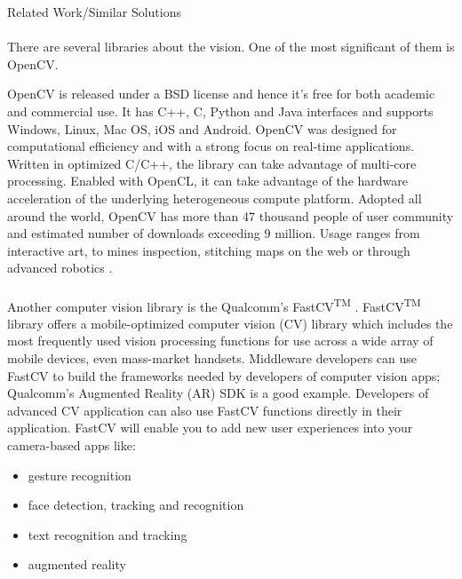 \documentclass[12pt, a4paper]{article} \pagenumbering{gobble}
\begin{document}
\vfill
\newpage
\begin{section}{Related Work/Similar Solutions}
\paragraph{}{
There are several libraries about the vision. One of the most significant of them is OpenCV.

OpenCV is released under a BSD license and hence it’s free for
both academic and commercial use. It has C++, C, Python and Java interfaces and supports Windows, Linux, Mac OS,
iOS and Android. OpenCV was designed for computational efficiency and with a strong focus on real-time applications.
Written in optimized C/C++, the library can take advantage of multi-core processing. Enabled with OpenCL, it can
take advantage of the hardware acceleration of the underlying heterogeneous compute platform. Adopted all around
the world, OpenCV has more than 47 thousand people of user community and estimated number of downloads exceeding 9
million. Usage ranges from interactive art, to mines inspection, stitching maps on the web or through advanced
robotics \cite{opencv}.
}

  \paragraph{}{
Another computer vision library is the Qualcomm's FastCV\textsuperscript{TM} \cite{fastcv}. FastCV\textsuperscript{TM} library offers a
mobile-optimized computer vision (CV) library which includes the most frequently used vision processing functions
for use across a wide array of mobile devices, even mass-market handsets. Middleware developers can use FastCV to
build the frameworks needed by developers of computer vision apps; Qualcomm's Augmented Reality (AR) SDK is a good
example. Developers of advanced CV application can also use FastCV functions directly in their application. FastCV will
enable you to add new user experiences into your camera-based apps like:
\begin{itemize}
  \item gesture recognition
  \item face detection, tracking and recognition
  \item text recognition and tracking
  \item augmented reality
\end{itemize}

}


\end{section}
\end{document}
